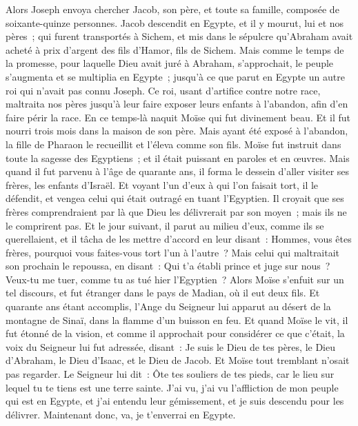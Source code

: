 \begin{multicols}{2}
Alors Joseph envoya chercher Jacob, son père, et toute sa famille, composée de soixante-quinze personnes.
Jacob descendit en Egypte, et il y mourut, lui et nos pères~;
qui furent transportés à Sichem, et mis dans le sépulcre qu'Abraham avait acheté à prix d'argent des fils d'Hamor, fils de Sichem.
Mais comme le temps de la promesse, pour laquelle Dieu avait juré à Abraham, s'approchait, le peuple s'augmenta et se multiplia en Egypte~;
jusqu'à ce que parut en Egypte un autre roi qui n'avait pas connu Joseph.
Ce roi, usant d'artifice contre notre race, maltraita nos pères jusqu'à leur faire exposer leurs enfants à l'abandon, afin d'en faire périr la race.
En ce temps-là naquit Moïse qui fut divinement beau. Et il fut nourri trois mois dans la maison de son père.
Mais ayant été exposé à l'abandon, la fille de Pharaon le recueillit et l'éleva comme son fils.
Moïse fut instruit dans toute la sagesse des Egyptiens~; et il était puissant en paroles et en œuvres.
Mais quand il fut parvenu à l'âge de quarante ans, il forma le dessein d'aller visiter ses frères, les enfants d'Israël.
Et voyant l'un d'eux à qui l'on faisait tort, il le défendit, et vengea celui qui était outragé en tuant l'Egyptien.
Il croyait que ses frères comprendraient par là que Dieu les délivrerait par son moyen~; mais ils ne le comprirent pas.
Et le jour suivant, il parut au milieu d'eux, comme ils se querellaient, et il tâcha de les mettre d'accord en leur disant~: Hommes, vous êtes frères, pourquoi vous faites-vous tort l'un à l'autre~?
Mais celui qui maltraitait son prochain le repoussa, en disant~: Qui t'a établi prince et juge sur nous~?
Veux-tu me tuer, comme tu as tué hier l'Egyptien~?
Alors Moïse s'enfuit sur un tel discours, et fut étranger dans le pays de Madian, où il eut deux fils.
Et quarante ans étant accomplis, l'Ange du Seigneur lui apparut au désert de la montagne de Sinaï, dans la flamme d'un buisson en feu.
Et quand Moïse le vit, il fut étonné de la vision, et comme il approchait pour considérer ce que c'était, la voix du Seigneur lui fut adressée, disant~:
Je suis le Dieu de tes pères, le Dieu d'Abraham, le Dieu d'Isaac, et le Dieu de Jacob. Et Moïse tout tremblant n'osait pas regarder.
Le Seigneur lui dit~: Ôte tes souliers de tes pieds, car le lieu sur lequel tu te tiens est une terre sainte.
J'ai vu, j'ai vu l'affliction de mon peuple qui est en Egypte, et j'ai entendu leur gémissement, et je suis descendu pour les délivrer. Maintenant donc, va, je t'enverrai en Egypte.

\end{multicols}
